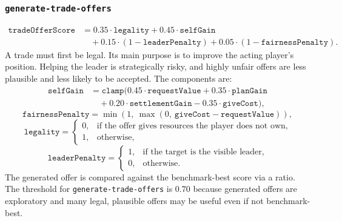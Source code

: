\documentclass{article}
\begin{document}
\subsubsection{\texttt{generate-trade-offers}}
\label{app:task-generate-trade-offers}
\[
\begin{aligned}
\texttt{tradeOfferScore}
&= 0.35 \cdot \texttt{legality}
+ 0.45 \cdot \texttt{selfGain} \\
&\quad + 0.15 \cdot (1 - \texttt{leaderPenalty})
+ 0.05 \cdot (1 - \texttt{fairnessPenalty}).
\end{aligned}
\]
A trade must first be legal. Its main purpose is to improve the acting player's position. Helping the leader is strategically risky, and highly unfair offers are less plausible and less likely to be accepted.
The components are:
\[
\begin{aligned}
\texttt{selfGain}
&= \texttt{clamp}(0.45 \cdot \texttt{requestValue}
+ 0.35 \cdot \texttt{planGain} \\
&\quad + 0.20 \cdot \texttt{settlementGain}
- 0.35 \cdot \texttt{giveCost}),
\end{aligned}
\]
\[
\texttt{fairnessPenalty}
= \min(1,\ \max(0,\ \texttt{giveCost} - \texttt{requestValue})),
\]
\[
\texttt{legality} =
\begin{cases}
0, & \text{if the offer gives resources the player does not own},\\
1, & \text{otherwise},
\end{cases}
\]
\[
\texttt{leaderPenalty} =
\begin{cases}
1, & \text{if the target is the visible leader},\\
0, & \text{otherwise}.
\end{cases}
\]
The generated offer is compared against the benchmark-best score via a ratio.
\\
The threshold for \texttt{generate-trade-offers} is $0.70$ because generated offers are exploratory and many legal, plausible offers may be useful even if not benchmark-best.
\end{document}
